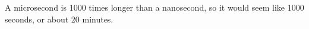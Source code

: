 A microsecond is 1000 times longer than a nanosecond, so it would seem like 1000 seconds, or about 20 minutes.



